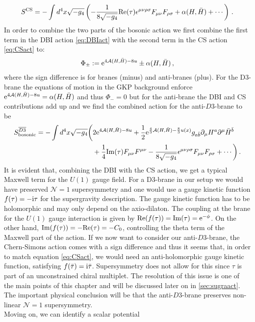 \documentclass[12pt]{report}
\newcommand{\be}{\begin{equation}}
\newcommand{\ee}{\end{equation}}
\newcommand{\bea}{\begin{equation}\begin{aligned}}
\newcommand{\eea}{\end{aligned}\end{equation}}
\def\rmi{{\rm i}}
\def\rme{{\rm e}}
\def\rmre{{\rm Re}}
\def\rmim{{\rm Im}}
\begin{document}
\be 
S^{\text{CS}}=-\int d^4x \sqrt{-g_4} \left(-\frac{1}{8 \sqrt{-g_4}}\rmre(\tau) \epsilon^{\mu \nu \rho \sigma} F_{\mu \nu} F_{\rho \sigma} + \alpha(H,\bar{H}) + \cdots \right)\,.
\label{eq:CSact}
\ee
In order to combine the two parts of the bosonic action we first combine the first term in the DBI action \eqref{eq:DBIact} with the second term in the CS action \eqref{eq:CSact} to:
\be 
\Phi_\pm := \rme^{4\mathcal{A}(H,\bar{H})-8u} \pm \alpha(H,\bar{H})\,,
\ee
where the sign difference is for branes (minus) and anti-branes (plus). For the D3-brane the equations of motion in the GKP background enforce  $\rme^{4\mathcal{A}(H,\bar{H})-8u} = \alpha(H,\bar{H})$ and thus $\Phi_-=0$ but for the anti-brane the DBI and CS contributions add up and we find the combined action for the anti-$D3$-brane to be
\bea 
S^{\overline{D3}}_{\text{bosonic}}= -\int d^4x \sqrt{-g_4} \bigg(&2 \rme^{4\mathcal{A}(H,\bar{H})-8u} + \frac{1}{2} \rme^{\frac{4}{3} \mathcal{A}(H,\bar{H})-\frac{8}{3} u(x)} g_{a\bar{b}} \partial_\mu H^a \partial^\mu \bar{H}^{\bar{b}} \\&+ \frac{1}{4} \rmim(\tau)F_{\mu\nu} F^{\mu \nu} - \frac{1}{8 \sqrt{-g_4}} \epsilon^{\mu \nu \rho \sigma} F_{\mu \nu} F_{\rho \sigma} + \cdots \bigg)\,.
\label{eq:simpbosact}
\eea 
It is evident that, combining the DBI with the CS action, we get a typical Maxwell term for the $U(1)$ gauge field.  For a D3-brane in our setup we would have preserved $\mathcal{N}=1$ supersymmetry and one would use a gauge kinetic function $f(\tau)=-\rmi \tau$ for the supergravity description. The gauge kinetic function has to be holomorphic and may only depend on the axio-dilaton. The coupling at the brane for the $U(1)$ gauge interaction is given by $\rmre(f(\tau)) = \rmim(\tau) = \rme^{-\phi}$. On the other hand, $\rmim(f(\tau)) = - \rmre(\tau) = -C_0$, controlling the theta term of the Maxwell part of the action. If we now want to consider our anti-$D3$-brane, the Chern-Simons action comes with a sign difference and thus it seems that, in order to match equation \eqref{eq:CSact}, we would need an anti-holomorphic gauge kinetic function, satisfying $f(\bar{\tau})= \rmi \bar{\tau}$. Supersymmetry does not allow for this since $\tau$ is part of an unconstrained chiral multiplet. The resolution of this issue is one of the main points of this chapter and will be discussed later on in \ref{sec:sugraact}. The important physical conclusion will be that the anti-$D3$-brane preserves non-linear $\mathcal{N}=1$ supersymmetry.\\
Moving on, we can identify a scalar potential
\end{document}
